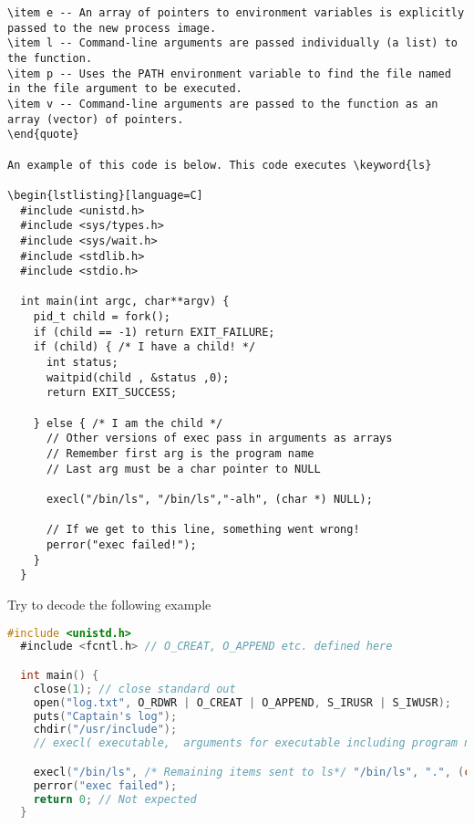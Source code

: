 \begin{lstlisting}
\item e -- An array of pointers to environment variables is explicitly passed to the new process image.
\item l -- Command-line arguments are passed individually (a list) to the function.
\item p -- Uses the PATH environment variable to find the file named in the file argument to be executed.
\item v -- Command-line arguments are passed to the function as an array (vector) of pointers.
\end{quote}

An example of this code is below. This code executes \keyword{ls}

\begin{lstlisting}[language=C]
  #include <unistd.h>
  #include <sys/types.h> 
  #include <sys/wait.h>
  #include <stdlib.h>
  #include <stdio.h>

  int main(int argc, char**argv) {
    pid_t child = fork();
    if (child == -1) return EXIT_FAILURE;
    if (child) { /* I have a child! */
      int status;
      waitpid(child , &status ,0);
      return EXIT_SUCCESS;

    } else { /* I am the child */
      // Other versions of exec pass in arguments as arrays
      // Remember first arg is the program name
      // Last arg must be a char pointer to NULL

      execl("/bin/ls", "/bin/ls","-alh", (char *) NULL);

      // If we get to this line, something went wrong!
      perror("exec failed!");
    }
  }
\end{lstlisting}

Try to decode the following example

\begin{lstlisting}[language=C]
  #include <unistd.h>
  #include <fcntl.h> // O_CREAT, O_APPEND etc. defined here

  int main() {
    close(1); // close standard out
    open("log.txt", O_RDWR | O_CREAT | O_APPEND, S_IRUSR | S_IWUSR);
    puts("Captain's log");
    chdir("/usr/include");
    // execl( executable,  arguments for executable including program name and NULL at the end)

    execl("/bin/ls", /* Remaining items sent to ls*/ "/bin/ls", ".", (char *) NULL); // "ls ."
    perror("exec failed");
    return 0; // Not expected
  }
\end{lstlisting}

